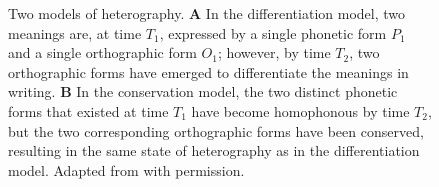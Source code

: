 \documentclass[doc,biblatex]{apa7}
\begin{document}
	\begin{figure}
	\vspace*{2pt}
	\caption{Two models of heterography. \textbf{A} In the differentiation model, two meanings are, at time $T_1$, expressed by a single phonetic form $P_1$ and a single orthographic form $O_1$; however, by time $T_2$, two orthographic forms have emerged to differentiate the meanings in writing. \textbf{B} In the conservation model, the two distinct phonetic forms that existed at time $T_1$ have become homophonous by time $T_2$, but the two corresponding orthographic forms have been conserved, resulting in the same state of heterography as in the differentiation model. Adapted from \textcite[pp.~325--326]{Berg:2021} with permission.}
	\label{models_of_heterography}
	\end{figure}
\end{document}
